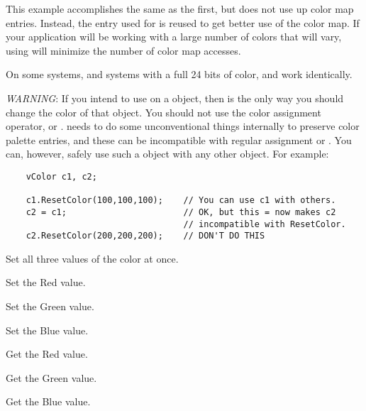 This example accomplishes the same as the first, but does not use
up color map entries. Instead, the entry used for 
is reused to get better use of the color map. If your application
will be working with a large number of colors that will vary,
using  will minimize the number of color map accesses.

On some systems, and systems with a full 24 bits of color,
 and  work identically.

\emph{WARNING}: If you intend to use  on a
 object, then  is the only way
you should change the color of that object. You should not
use the color assignment operator, or . 
needs to do some unconventional things internally to
preserve color palette entries, and these can be incompatible
with regular assignment or . You can, however,
safely use such a  object with any other 
object. For example:

\footnotesize
\begin{verbatim}
    vColor c1, c2;

    c1.ResetColor(100,100,100);    // You can use c1 with others.
    c2 = c1;                       // OK, but this = now makes c2
                                   // incompatible with ResetColor.
    c2.ResetColor(200,200,200);    // DON'T DO THIS
\end{verbatim}
\normalfont\normalsize


Set all three values of the color at once.


Set the Red value.


Set the Green value.


Set the Blue value.


Get the Red value.


Get the Green value.


Get the Blue value.

